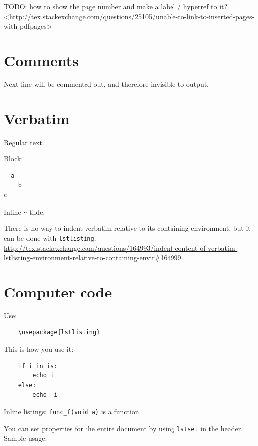 \documentclass[12pt]{article}
\begin{document}
  

  TODO: how to show the page number and make a label / hyperref to it? <http://tex.stackexchange.com/questions/25105/unable-to-link-to-inserted-pages-with-pdfpages>

\section{Comments}\label{comments}

    Next line will be commented out, and therefore invisible to output.

\section{Verbatim}\label{verbatim}

  Regular text.

  Block:

  \begin{verbatim}
  a
    b
c
  \end{verbatim}

  Inline \verb|~| tilde.

  There is no way to indent verbatim relative to its containing environment, but it can be done with \lstinline|lstlisting|.
  \url{http://tex.stackexchange.com/questions/164993/indent-content-of-verbatim-lstlisting-environment-relative-to-containing-envir#164999}

\section{Computer code}\label{computer-code}

  Use:

  \begin{lstlisting}
    \usepackage{lstlisting}
  \end{lstlisting}

  This is how you use it:

  \begin{lstlisting}
    if i in is:
        echo i
    else:
        echo -i
  \end{lstlisting}

  Inline listings: \lstinline|func_f(void a)| is a function.

  You can set properties for the entire document by using \lstinline|lstset| in the header.
  Sample usage:
\end{document}
